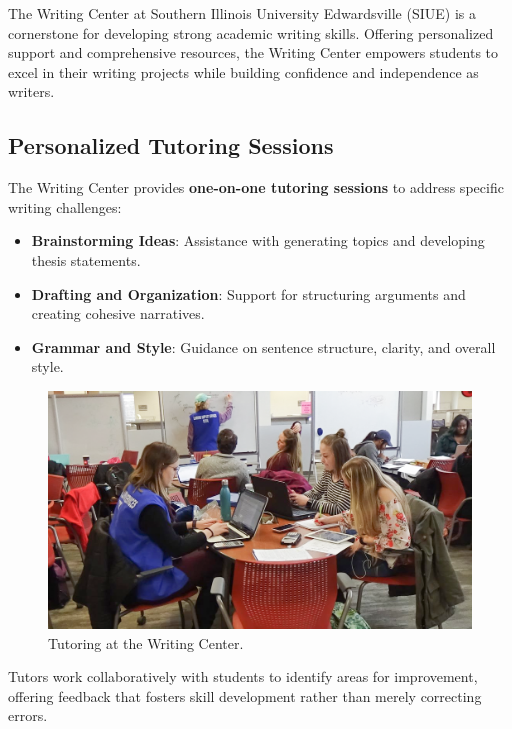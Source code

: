 \documentclass[
]{book}
\providecommand{\tightlist}{%
  \setlength{\itemsep}{0pt}\setlength{\parskip}{0pt}}
\begin{document}
The Writing Center at Southern Illinois University Edwardsville (SIUE) is a cornerstone for developing strong academic writing skills. Offering personalized support and comprehensive resources, the Writing Center empowers students to excel in their writing projects while building confidence and independence as writers.

\subsection*{Personalized Tutoring Sessions}\label{personalized-tutoring-sessions}

The Writing Center provides \textbf{one-on-one tutoring sessions} to address specific writing challenges:

\begin{itemize}
\tightlist
\item
  \textbf{Brainstorming Ideas}: Assistance with generating topics and developing thesis statements.
\item
  \textbf{Drafting and Organization}: Support for structuring arguments and creating cohesive narratives.
\item
  \textbf{Grammar and Style}: Guidance on sentence structure, clarity, and overall style.
\end{itemize}

\begin{figure}
\centering
\includegraphics[width=1\linewidth,height=\textheight,keepaspectratio]{images/tutoring.png}
\caption{Tutoring at the Writing Center.}
\end{figure}

Tutors work collaboratively with students to identify areas for improvement, offering feedback that fosters skill development rather than merely correcting errors.
\end{document}
